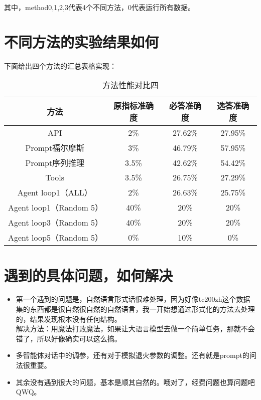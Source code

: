 \documentclass[answers]{exam}  %
\begin{document}
其中，method0,1,2,3代表4个不同方法，0代表运行所有数据。

\section{不同方法的实验结果如何}

下面给出四个方法的汇总表格实现：
\begin{table}[h]
    \centering
    \begin{tabular}{cccc}
    \toprule
    \textbf{方法} & \textbf{原指标准确度} & \textbf{必答准确度} &\textbf{选答准确度}\\
    \midrule
    API & 2\% & 27.62\% & 27.95\% \\
    \hline
    Prompt福尔摩斯 & 3\% & 46.79\% & 57.95\% \\
    \hline
    Prompt序列推理 & 3.5\% & 42.62\% & 54.42\% \\
    \hline
    Tools & 3.5\% & 26.75\% & 27.29\% \\
    \hline
    Agent loop1（ALL） & 2\% & 26.63\% & 25.75\% \\
    \hline
    \hline
    Agent loop1（Random 5） & 40\% & 20\% & 20\% \\
    \hline
    Agent loop3（Random 5） & 40\% & 20\% & 20\% \\
    \hline
    Agent loop5（Random 5） & 0\% & 10\% & 0\% \\
    \bottomrule
    \end{tabular}
    \caption{方法性能对比四}
\end{table}


\section{遇到的具体问题，如何解决}
\begin{itemize}
    \item 第一个遇到的问题是，自然语言形式话很难处理，因为好像tc200zh这个数据集的东西都是很自然很自然的自然语言，我一开始想通过形式化的方法去处理的，结果发现根本没有任何结构。\\
    解决方法：用魔法打败魔法，如果让大语言模型去做一个简单任务，那就不会错了，所以好像确实可以这么搞。
    \item 多智能体对话中的调参，还有对于模拟退火参数的调整。还有就是prompt的问法很重要。
    \item 其余没有遇到很大的问题，基本是顺其自然的。哦对了，经费问题也算问题吧QWQ。
\end{itemize}
\end{document}
